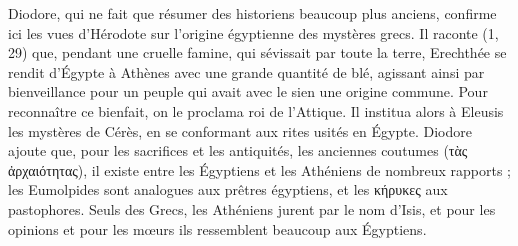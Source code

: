 \documentclass[a4paper, 11pt, oneside]{article}
\begin{document}
Diodore, qui ne fait que résumer des historiens beaucoup plus anciens, confirme ici les vues d'Hérodote sur l'origine égyptienne des mystères grecs. Il raconte (1, 29) que, pendant une cruelle famine, qui sévissait par toute la terre, Erechthée se rendit d'Égypte à Athènes avec une grande quantité de blé, agissant ainsi par bienveillance pour un peuple qui avait avec le sien une origine commune. Pour reconnaître ce bienfait, on le proclama roi de l'Attique. Il institua alors à Eleusis les mystères de Cérès, en se conformant aux rites usités en Égypte. Diodore ajoute que, pour les sacrifices et les antiquités, les anciennes coutumes (τὰς ἀρχαιότητας), il existe entre les Égyptiens et les Athéniens de nombreux rapports ; les Eumolpides sont analogues aux prêtres égyptiens, et les κήρυκες aux pastophores. Seuls des Grecs, les Athéniens jurent par le nom d'Isis, et pour les opinions et pour les mœurs ils ressemblent beaucoup aux Égyptiens.
\end{document}
